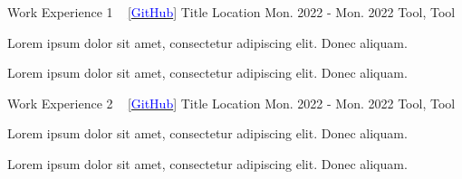 

\newcommand{\projectlinkA}{
    \href{Hlink}{[\textcolor{blue}{GitHub}}]
    }

\newcommand{\projectlinkB}{
    \href{Hlink}{[\textcolor{blue}{GitHub}}]
    }

\begin{cventries}

    

  \cventrydt
    {Work Experience 1 \ \projectlinkA} %
    {Title}
    {Location} %
    {Mon. 2022 - Mon. 2022} %
    {Tool, Tool} %
    {
      \begin{cvitems} %
        \item {Lorem ipsum dolor sit amet, consectetur adipiscing elit. Donec aliquam.}
        \item {Lorem ipsum dolor sit amet, consectetur adipiscing elit. Donec aliquam.}
        \end{cvitems}
    }


  \cventrydt
    {Work Experience 2 \ \projectlinkB} %
    {Title}
    {Location} %
    {Mon. 2022 - Mon. 2022} %
    {Tool, Tool} %
    {
      \begin{cvitems} %
        \item {Lorem ipsum dolor sit amet, consectetur adipiscing elit. Donec aliquam.}
        \item {Lorem ipsum dolor sit amet, consectetur adipiscing elit. Donec aliquam.}
        \end{cvitems}
    }

    
\end{cventries}
